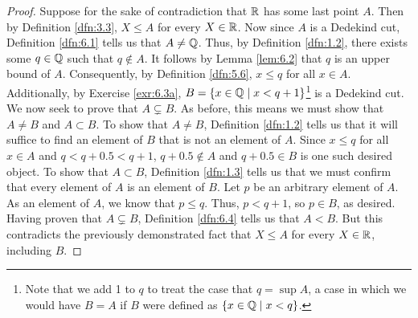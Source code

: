 \documentclass[../main.tex]{subfiles}
\begin{document}
\begin{exercise}
\begin{proof}
        Suppose for the sake of contradiction that $\mathbb{R}$ has some last point $A$. Then by Definition \ref{dfn:3.3}, $X\leq A$ for every $X\in\mathbb{R}$. Now since $A$ is a Dedekind cut, Definition \ref{dfn:6.1} tells us that $A\neq\mathbb{Q}$. Thus, by Definition \ref{dfn:1.2}, there exists some $q\in\mathbb{Q}$ such that $q\notin A$. It follows by Lemma \ref{lem:6.2} that $q$ is an upper bound of $A$. Consequently, by Definition \ref{dfn:5.6}, $x\leq q$ for all $x\in A$. Additionally, by Exercise \ref{exr:6.3a}, $B=\{x\in\mathbb{Q}\mid x<q+1\}$\footnote{Note that we add 1 to $q$ to treat the case that $q=\sup A$, a case in which we would have $B=A$ if $B$ were defined as $\{x\in\mathbb{Q}\mid x<q\}$.} is a Dedekind cut. We now seek to prove that $A\subsetneq B$. As before, this means we must show that $A\neq B$ and $A\subset B$. To show that $A\neq B$, Definition \ref{dfn:1.2} tells us that it will suffice to find an element of $B$ that is not an element of $A$. Since $x\leq q$ for all $x\in A$ and $q<q+0.5<q+1$, $q+0.5\notin A$ and $q+0.5\in B$ is one such desired object. To show that $A\subset B$, Definition \ref{dfn:1.3} tells us that we must confirm that every element of $A$ is an element of $B$. Let $p$ be an arbitrary element of $A$. As an element of $A$, we know that $p\leq q$. Thus, $p<q+1$, so $p\in B$, as desired. Having proven that $A\subsetneq B$, Definition \ref{dfn:6.4} tells us that $A<B$. But this contradicts the previously demonstrated fact that $X\leq A$ for every $X\in\mathbb{R}$, including $B$.
    \end{proof}
\end{exercise}
\end{document}
